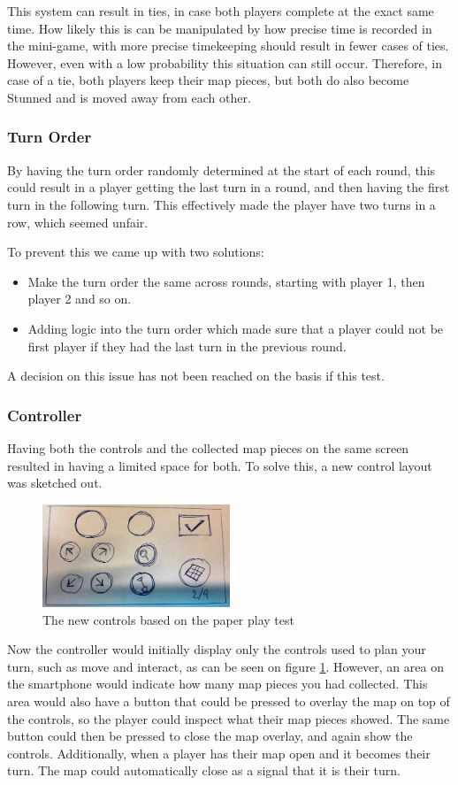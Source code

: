 This system can result in ties, in case both players complete at the exact same time. How likely this is can be manipulated by how precise time is recorded in the mini-game, with more precise timekeeping should result in fewer cases of ties. However, even with a low probability this situation can still occur. Therefore, in case of a tie, both players keep their map pieces, but both do also become Stunned and is moved away from each other.

\subsubsection{Turn Order}
By having the turn order randomly determined at the start of each round, this could result in a player getting the last turn in a round, and then having the first turn in the following turn. This effectively made the player have two turns in a row, which seemed unfair.


To prevent this we came up with two solutions:
\begin{itemize}
\item Make the turn order the same across rounds, starting with player 1, then player 2 and so on.
\item Adding logic into the turn order which made sure that a player could not be first player if they had the last turn in the previous round.
\end{itemize}

A decision on this issue has not been reached on the basis if this test.

\subsubsection{Controller}
Having both the controls and the collected map pieces on the same screen resulted in having a limited space for both. To solve this, a new control layout was sketched out.

\begin{figure}[h]
\centering
\includegraphics[width=0.5\textwidth]{figures/RevisedControl} 
\caption{The new controls based on the paper play test}\label{fig:PPtest4}
\end{figure}

Now the controller would initially display only the controls used to plan your turn, such as move and interact, as can be seen on figure \ref{fig:PPtest4}. However, an area on the smartphone would indicate how many map pieces you had collected. This area would also have a button that could be pressed to overlay the map on top of the controls, so the player could inspect what their map pieces showed. The same button could then be pressed to close the map overlay, and again show the controls. Additionally, when a player has their map open and it becomes their turn. The map could automatically close as a signal that it is their turn.


